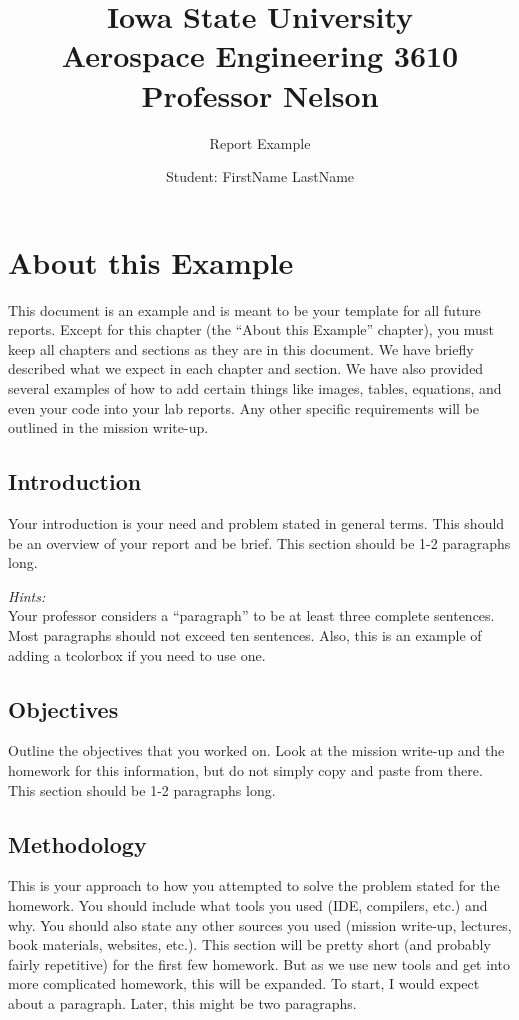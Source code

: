\documentclass{report}
\title{\textbf{Iowa State University
\\{\Large Aerospace Engineering 3610 \\Professor Nelson}}}
\subtitle{Report Example}
\author{Student: FirstName LastName}
\begin{document}
\maketitle
\tableofcontents
\chapter{About this Example}
This document is an example and is meant to be your template for all future reports. Except for this chapter (the ``About this Example'' chapter), you must keep all chapters and sections as they are in this document. We have briefly described what we expect in each chapter and section. We have also provided several examples of how to add certain things like images, tables, equations, and even your code into your lab reports. Any other specific requirements will be outlined in the mission write-up. 


\section{Introduction}
Your introduction is your need and problem stated in general terms. This should be an overview of your report and be brief. This section should be 1-2 paragraphs long.

\begin{tcolorbox}
\emph{Hints:} \\
Your professor considers a ``paragraph'' to be at least three complete sentences. Most paragraphs should not exceed ten sentences. Also, this is an example of adding a tcolorbox if you need to use one.
\end{tcolorbox}

\section{Objectives}
Outline the objectives that you worked on. Look at the mission write-up and the homework for this information, but do not simply copy and paste from there. This section should be 1-2 paragraphs long.

\section{Methodology}
This is your approach to how you attempted to solve the problem stated for the homework. You should include what tools you used (IDE, compilers, etc.) and why. You should also state any other sources you used (mission write-up, lectures, book materials, websites, etc.). This section will be pretty short (and probably fairly repetitive) for the first few homework. But as we use new tools and get into more complicated homework, this will be expanded. To start, I would expect about a paragraph. Later, this might be two paragraphs.
\end{document}
